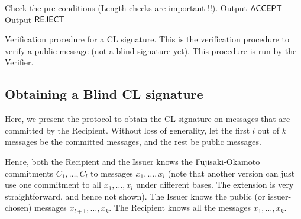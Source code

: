 \begin{algorithm}[H]\label{verifyCL}
\dontprintsemicolon

\BlankLine

 \;
\Indp
  Check the pre-conditions (Length checks are important !!). \;
    {Output $\mathsf{ACCEPT}$ \;}
  \Else
    {Output $\mathsf{REJECT}$ \;}
\Indm

\caption{Verification procedure for a CL signature. This is the verification procedure to verify a public message (not a blind signature yet). This procedure is run by the Verifier.}
\end{algorithm}



\subsection{Obtaining a Blind CL signature}
Here, we present the protocol to obtain the CL signature on messages that are committed by the Recipient. Without loss of generality, let the first $l$ out of $k$ messages be the committed messages, and the rest be public messages.

Hence, both the Recipient and the Issuer knows the Fujisaki-Okamoto commitments $C_1,\ldots,C_l$ to messages $x_1,\ldots,x_l$ (note that another version can just use one commitment to all $x_1,\ldots,x_l$ under different bases. The extension is very straightforward, and hence not shown). The Issuer knows the public (or issuer-chosen) messages $x_{l+1},\ldots,x_k$. The Recipient knows all the messages $x_1,\ldots,x_k$.



